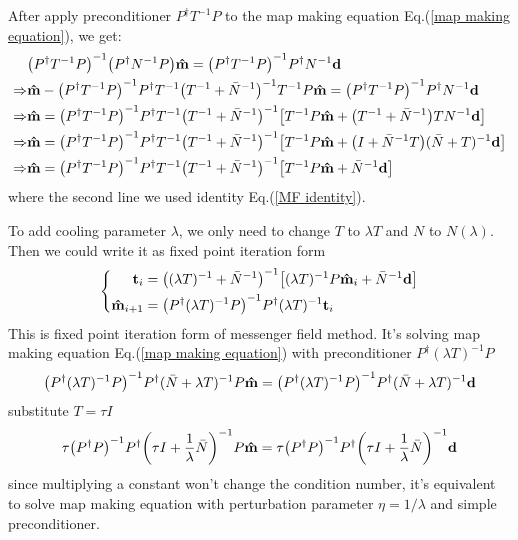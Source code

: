 \documentclass[11pt, letterpaper]{article}
\newcommand{\vbd}{\vb{d}}
\newcommand{\inv}[1]{#1^{-1}}
\newcommand{\hatm}{\vb{\hat{m}}}
\newcommand{\Pdagger}{P^{\dagger}}
\newcommand{\Nbar}{\bar{N}}
\newcommand{\PPinv}[1]{\inv{\qty(\Pdagger #1 P)}}
\begin{document}
After apply preconditioner $\Pdagger \inv{T} P$ to the map making equation
Eq.(\ref{map making equation}), we get:
\begin{align}
\begin{aligned}[b]
\mathrel{\phantom{\Rightarrow}}
&\PPinv{\inv{T}} \qty(\Pdagger \inv{N} P) \hatm
= \PPinv{\inv{T}} \Pdagger \inv{N} \vbd
\\ \Rightarrow
&\hatm - \PPinv{\inv{T}} \Pdagger \inv{T} 
    \inv{\qty(\inv{T}+\inv{\Nbar})} \inv{T} P\hatm
= \PPinv{\inv{T}} \Pdagger \inv{N} \vbd
\\ \Rightarrow
& \hatm = \PPinv{\inv{T}} \Pdagger \inv{T} \inv{\qty(\inv{T} + \inv{\Nbar})} 
    \qty[ \inv{T}P\hatm + \qty(\inv{T}+\inv{\Nbar}) T \inv{N}\vbd]
\\ \Rightarrow
& \hatm = \PPinv{\inv{T}} \Pdagger \inv{T} \inv{\qty(\inv{T} + \inv{\Nbar})} 
    \qty[ \inv{T}P\hatm + \qty(I+\inv{\Nbar}T) \inv{(\Nbar + T)}\vbd]
\\ \Rightarrow
& \hatm = \PPinv{\inv{T}} \Pdagger \inv{T} 
    \inv{\qty(\inv{T} + \inv{\Nbar})} \qty[ \inv{T}P\hatm + \inv{\Nbar}\vbd]
\end{aligned}
\end{align}
where the second line we used identity Eq.(\ref{MF identity}).

To add cooling parameter $\lambda$, we only need to change $T$ to $\lambda T$
and $N$ to $N(\lambda)$.
Then we could  write it as fixed point iteration form
\begin{equation}
\left\{\!
\begin{aligned}
\vb{t}_i &= \inv{\qty(\inv{(\lambda T)} + \inv{\Nbar})} 
    \qty[ \inv{(\lambda T)}P\hatm_i + \inv{\Nbar}\vbd]\\
\hatm_{i+1} &= \PPinv{\inv{(\lambda T)}} \Pdagger \inv{(\lambda T)} \vb{t}_i 
\end{aligned}
\right.
\end{equation}
This is fixed point iteration form of messenger field method.
It's solving map making equation Eq.(\ref{map making equation}) with
preconditioner $\Pdagger \inv{(\lambda T)} P$
\begin{align}
\PPinv{\inv{(\lambda T)}} \Pdagger \inv{(\Nbar + \lambda T)} P \hatm
= \PPinv{\inv{(\lambda T)}} \Pdagger \inv{(\Nbar + \lambda T)} \vbd
\end{align}
substitute $T = \tau I$ 
\begin{align}
\tau \PPinv{} \Pdagger \inv{\qty(\tau I + \frac{1}{\lambda}\Nbar)} P \hatm 
= \tau \PPinv{} \Pdagger \inv{\qty(\tau I + \frac{1}{\lambda}\Nbar)} \vbd
\label{lambda eta equiv}
\end{align}
since multiplying a constant won't change the condition number, it's equivalent
to solve map making equation with perturbation parameter $\eta = 1/\lambda$ and
simple preconditioner.
\end{document}
